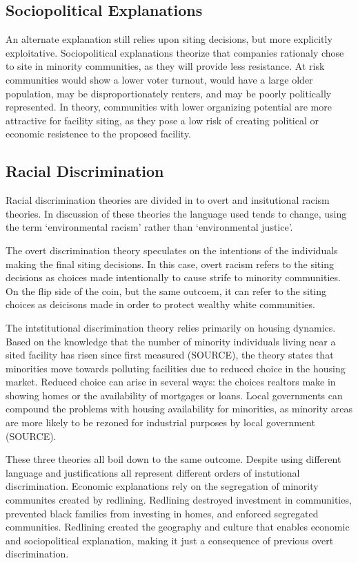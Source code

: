 \documentclass[12pt,twoside]{dukestatscithesis}
\theoremstyle{definition}
\theoremstyle{definition}
\theoremstyle{definition}
\theoremstyle{remark}
\begin{document}
\subsection{Sociopolitical
Explanations}\label{sociopolitical-explanations}

An alternate explanation still relies upon siting decisions, but more
explicitly exploitative. Sociopolitical explanations theorize that
companies rationaly chose to site in minority communities, as they will
provide less resistance. At risk communities would show a lower voter
turnout, would have a large older population, may be disproportionately
renters, and may be poorly politically represented. In theory,
communities with lower organizing potential are more attractive for
facility siting, as they pose a low risk of creating political or
economic resistence to the proposed facility.

\subsection{Racial Discrimination}\label{racial-discrimination}

Racial discrimination theories are divided in to overt and insitutional
racism theories. In discussion of these theories the language used tends
to change, using the term `environmental racism' rather than
`environmental justice'.

The overt discrimination theory speculates on the intentions of the
individuals making the final siting decisions. In this case, overt
racism refers to the siting decisions as choices made intentionally to
cause strife to minority communities. On the flip side of the coin, but
the same outcoem, it can refer to the siting choices as deicisons made
in order to protect wealthy white communities.

The intstitutional discrimination theory relies primarily on housing
dynamics. Based on the knowledge that the number of minority individuals
living near a sited facility has risen since first measured (SOURCE),
the theory states that minorities move towards polluting facilities due
to reduced choice in the housing market. Reduced choice can arise in
several ways: the choices realtors make in showing homes or the
availability of mortgages or loans. Local governments can compound the
problems with housing availability for minorities, as minority areas are
more likely to be rezoned for industrial purposes by local government
(SOURCE).

These three theories all boil down to the same outcome. Despite using
different language and justifications all represent different orders of
instutional discrimination. Economic explanations rely on the
segregation of minority communites created by redlining. Redlining
destroyed investment in communities, prevented black families from
investing in homes, and enforced segregated communities. Redlining
created the geography and culture that enables economic and
sociopolitical explanation, making it just a consequence of previous
overt discrimination.
\end{document}

